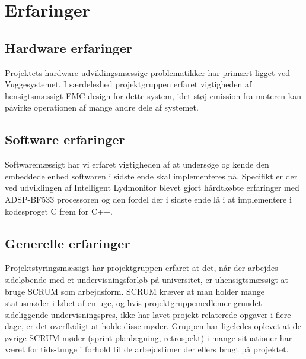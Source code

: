 \chapter{Erfaringer}

\section{Hardware erfaringer}
Projektets hardware-udviklingsmæssige problematikker har primært ligget ved Vuggesystemet. I særdeleshed projektgruppen erfaret vigtigheden af hensigtsmæssigt EMC-design for dette system, idet støj-emission fra moteren kan påvirke operationen af mange andre dele af systemet. 

\section{Software erfaringer}
Softwaremæssigt har vi erfaret vigtigheden af at undersøge og kende den embeddede enhed softwaren i sidste ende skal implementeres på. Specifikt er der ved udviklingen af Intelligent Lydmonitor blevet gjort hårdtkøbte erfaringer med ADSP-BF533 processoren og den fordel der i sidste ende lå i at implementere i kodesproget C frem for C++.

\section{Generelle erfaringer}
Projektstyringsmæssigt har projektgruppen erfaret at det, når der arbejdes sideløbende med et undervisningsforløb på universitet, er uhensigtsmæssigt at bruge SCRUM som arbejdsform. SCRUM kræver at man holder mange statusmøder i løbet af en uge, og hvis projektgruppemedlemer grundet sideliggende undervisningspres, ikke har lavet projekt relaterede opgaver i flere dage, er det overflødigt at holde disse møder. Gruppen har ligeledes oplevet at de øvrige SCRUM-møder (sprint-planlægning, retrospekt) i mange situationer har været for tids-tunge i forhold til de arbejdstimer der ellers brugt på projektet.

